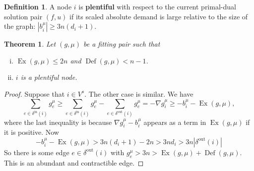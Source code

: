 \documentclass[11pt]{article}
\newtheorem{theorem}{Theorem}[section]
\theoremstyle{definition}
\newtheorem{definition}{Definition}[section]
\theoremstyle{definition}
\theoremstyle{definition}
\newcommand{\biu}{b_{i}^{\mu}}
\newcommand{\din}{\delta^{\text{in}}}
\newcommand{\dout}{\delta^{\text{out}}}
\newcommand{\vsrc}{V^{s}}
\DeclareMathOperator{\Ex}{Ex}
\DeclareMathOperator{\Def}{Def}
\renewcommand{\todo}[1]{\hl{TODO: #1}}
\begin{document}
    \begin{definition}
    A node $i$ is \textbf{plentiful} with respect
    to the current primal-dual solution pair $(f,u)$ if its scaled absolute
    demand is large relative to the size of the graph: $|b_i^{\mu}| \ge 3n(d_i + 1)$.
    \end{definition}
	\begin{theorem}
		Let $(g, \mu)$ be a fitting pair such that
		\begin{enumerate}[(i)]
			\item $\Ex(g, \mu) \leq 2n$ and $\Def(g, \mu) < n - 1$.
			\item $i$ is a plentiful node.
		\end{enumerate}
	\end{theorem}
	\begin{proof}
		Suppose that $i \in \vsrc$. The other case is similar. We have
		\[ \sum_{e \in \din(i)} g^\mu_e \geq
		\sum_{e \in \din(i)} g^\mu_e - \sum_{e \in \dout(i)} g^\mu_e
		= -\nabla g^\mu_i \geq -b_i^\mu - \Ex(g, \mu), \]
		where the last inequality is because $\nabla g_i^\mu - \biu$ appears
		as a term in $\Ex(g, \mu)$ if it is positive. Now
		\[ -b_i^\mu - \Ex(g, \mu) > 3n(d_i + 1) - 2n > 3nd_i > 3n|\dout(i)| \]
		So there is some edge $e \in \dout(i)$ with
		$g^\mu_e > 3n > \Ex(g, \mu) + \Def(g, \mu)$. This is an abundant and contractible
		edge.
	\end{proof}


%
\end{document}
